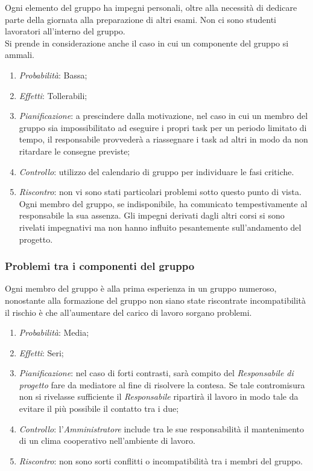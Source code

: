 Ogni elemento del gruppo ha impegni personali, oltre alla necessità di dedicare parte della giornata alla preparazione di altri esami. Non ci sono studenti lavoratori all'interno del gruppo. \\
Si prende in considerazione anche il caso in cui un componente del gruppo si ammali. 		
\begin{enumerate}
\item \textit{Probabilità}: Bassa;
\item \textit{Effetti}: Tollerabili;
\item \textit{Pianificazione}: a prescindere dalla motivazione, nel caso in cui un membro del gruppo sia impossibilitato ad eseguire i propri task per un periodo limitato di tempo, il responsabile provvederà a riassegnare i task ad altri in modo da non ritardare le consegne previste;
\item \textit{Controllo}: utilizzo del calendario di gruppo per individuare le fasi critiche.
\item \textit{Riscontro}: non vi sono stati particolari problemi sotto questo punto di vista. Ogni membro del gruppo, se indisponibile, ha comunicato tempestivamente al responsabile la sua assenza. Gli impegni derivati dagli altri corsi si sono rivelati impegnativi ma non hanno influito pesantemente sull'andamento del progetto.
\end{enumerate}

		\subsubsection{Problemi tra i componenti del gruppo}

Ogni membro del gruppo è alla prima esperienza in un gruppo numeroso, nonostante alla formazione del gruppo non siano state riscontrate incompatibilità il rischio è che all'aumentare del carico di lavoro sorgano problemi.		
\begin{enumerate}
\item \textit{Probabilità}: Media;
\item \textit{Effetti}: Seri;
\item \textit{Pianificazione}: nel caso di forti contrasti, sarà compito del \textit{Responsabile di progetto} fare da mediatore al fine di risolvere la contesa. Se tale contromisura non si rivelasse sufficiente il \textit{Responsabile} ripartirà il lavoro in modo tale da evitare il più possibile il contatto tra i due;
\item \textit{Controllo}: l'\textit{Amministratore} include tra le sue responsabilità il mantenimento di un clima cooperativo nell'ambiente di lavoro.
\item \textit{Riscontro}: non sono sorti conflitti o incompatibilità tra i membri del gruppo.
\end{enumerate}	
		
